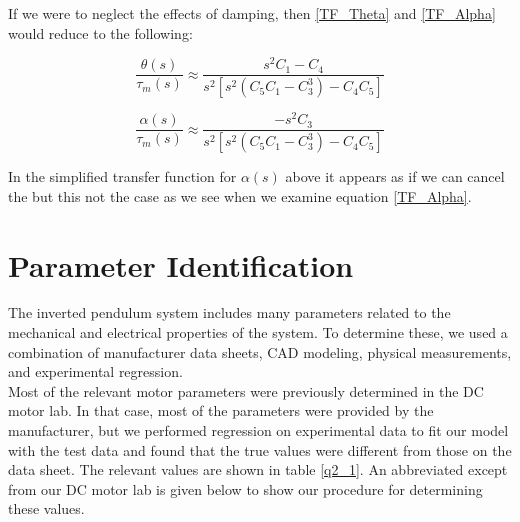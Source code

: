 \documentclass{article}
\theoremstyle{plain}
\theoremstyle{definition}
\theoremstyle{remark}
\begin{document}
If we were to neglect the effects of damping, then \eqref{TF_Theta} and \eqref{TF_Alpha} would reduce to the following:

$$ \frac{\theta(s)}{\tau_{m}(s)} \approx \frac{s^2 C_1 - C_4}{s^2 \left[s^2 \left(C_5 C_1 - C_3^3 \right) - C_4 C_5\right]} $$

$$ \frac{\alpha(s)}{\tau_{m}(s)} \approx \frac{- s^2 C_3}{s^2 \left[s^2 \left(C_5 C_1 - C_3^3 \right) - C_4 C_5\right]} $$

In the simplified transfer function for $\alpha (s)$ above it appears as if we can cancel the but this not the case as we see when we examine equation \eqref{TF_Alpha}.  

\clearpage

\section{ Parameter Identification}
The inverted pendulum system includes many parameters related to the mechanical and electrical properties of the system. To determine these, we used a combination of manufacturer data sheets, CAD modeling, physical measurements, and experimental regression.\\

Most of the relevant motor parameters were previously determined in the DC motor lab. In that case, most of the parameters were provided by the manufacturer, but we performed regression on experimental data to fit our model with the test data and found that the true values were different from those on the data sheet. The relevant values are shown in table \ref{q2_1}. An abbreviated except from our DC motor lab is given below to show our procedure for determining these values. \\
\end{document}
